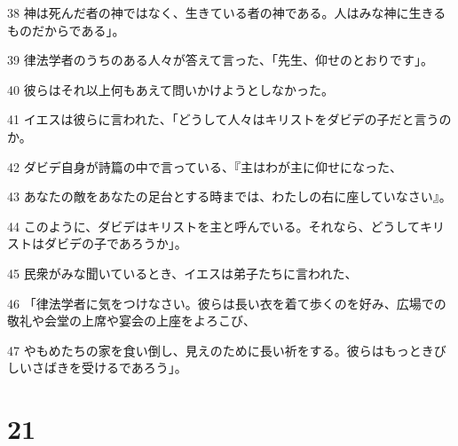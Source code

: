 \par 38 神は死んだ者の神ではなく、生きている者の神である。人はみな神に生きるものだからである」。
\par 39 律法学者のうちのある人々が答えて言った、「先生、仰せのとおりです」。
\par 40 彼らはそれ以上何もあえて問いかけようとしなかった。
\par 41 イエスは彼らに言われた、「どうして人々はキリストをダビデの子だと言うのか。
\par 42 ダビデ自身が詩篇の中で言っている、『主はわが主に仰せになった、
\par 43 あなたの敵をあなたの足台とする時までは、わたしの右に座していなさい』。
\par 44 このように、ダビデはキリストを主と呼んでいる。それなら、どうしてキリストはダビデの子であろうか」。
\par 45 民衆がみな聞いているとき、イエスは弟子たちに言われた、
\par 46 「律法学者に気をつけなさい。彼らは長い衣を着て歩くのを好み、広場での敬礼や会堂の上席や宴会の上座をよろこび、
\par 47 やもめたちの家を食い倒し、見えのために長い祈をする。彼らはもっときびしいさばきを受けるであろう」。

\chapter{21}


